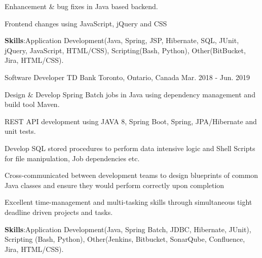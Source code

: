 \begin{cventries}
{\begin{cvitems}
        \item {Enhancement \& bug fixes in Java based backend.}
        \item { Frontend changes using JavaScript, jQuery and CSS }
        \vspace{1mm} %
        \item {\textbf{Skills}:Application Development(Java, Spring, JSP, Hibernate, SQL, JUnit,
        jQuery, JavaScript, HTML/CSS), Scripting(Bash, Python), Other(BitBucket, Jira, HTML/CSS).}
      \end{cvitems}
    }
    \vspace{5mm} %
  \cventry
    {Software Developer} %
    {TD Bank} %
    {Toronto, Ontario, Canada} %
    {Mar. 2018 - Jun. 2019} %
    {
      \begin{cvitems} %
        \item {Design \& Develop Spring Batch jobs in Java using dependency management and build tool Maven.}
        \item {REST API development using JAVA 8, Spring Boot, Spring, JPA/Hibernate and unit tests.}
        \item {Develop SQL stored procedures to perform data intensive logic and Shell Scripts for file manipulation, Job dependencies etc. }
        \item {Cross-communicated between development teams to design blueprints of common Java classes and ensure they would perform correctly upon completion}
        \item {Excellent time-management and multi-tasking skills through simultaneous tight deadline driven projects and tasks.}
        \vspace{1mm} %
        \item {\textbf{Skills}:Application Development(Java, Spring Batch, JDBC, Hibernate, JUnit), Scripting (Bash, Python), Other(Jenkins, Bitbucket, SonarQube, Confluence, Jira, HTML/CSS).}
      \end{cvitems}
    }

\end{cventries}